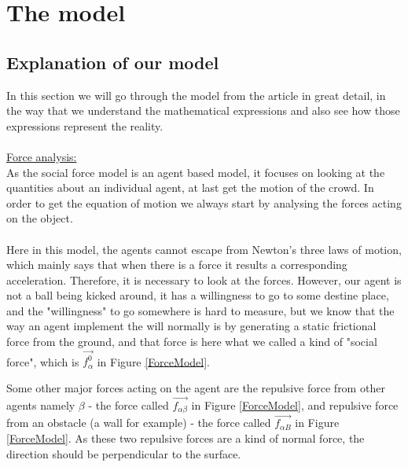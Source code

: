 
\section{The model}
\label{sec:the-model}


\subsection{Explanation of our model}
In this section we will go through the model from the article \cite{self-org} in great detail, in the way that we understand the mathematical expressions and also see how those expressions represent the reality. \\\\
\underline{Force analysis:} \\

As the social force model is an agent based model, it focuses on looking at the quantities about an individual agent, at last get the motion of the crowd. In order to get the equation of motion we always start by analysing the forces acting on the object.\\\\
Here in this model, the agents cannot escape 
from Newton's three laws of motion, which mainly says that when there is a force it results a corresponding acceleration.  Therefore, it is necessary to look at the forces.  However, our agent is not a ball being kicked around, 
it has a willingness to go to some destine place, and the "willingness" to go somewhere is hard to measure, but we know that the way an agent implement the will normally is by 
generating a static frictional force from the ground, and that force is here what we called 
a kind of "social force", which is $ \vec{f^{0}_{\alpha}} $ in Figure \ref{ForceModel}. 

Some other major forces acting on the agent are the repulsive force from other agents namely $ \beta $ - the force called $ \vec{f_{\alpha\beta}} $ in Figure \ref{ForceModel}, and repulsive force from an obstacle (a wall for example) - the force called $ \vec{f_{\alpha B}} $ in Figure \ref{ForceModel}.  As these two repulsive forces are a kind of normal force, the direction should be perpendicular to the surface.


